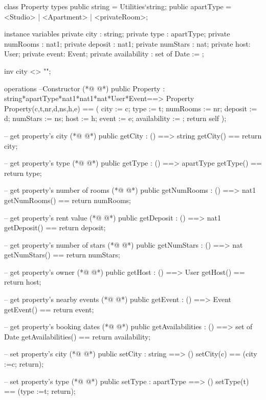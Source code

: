 \begin{vdmpp}[breaklines=true]
class Property
types
 public string = Utilities`string;
 public apartType = <Studio> | <Apartment> | <privateRoom>;

instance variables
 private city : string;
 private type : apartType;
 private numRooms : nat1;
 private deposit : nat1;
 private numStars : nat;
 private host: User;
 private event: Event;
 private availability : set of Date := {};
 
 inv city <> "";
 
operations
 --Constructor
(*@
\label{Property:20}
@*)
 public Property : string*apartType*nat1*nat1*nat*User*Event==> Property
  Property(c,t,nr,d,ns,h,e) ==
  (
   city := c;
   type := t;
   numRooms := nr;
   deposit := d;
   numStars := ns;
   host := h;
   event := e;
   availability := {};
   return self
  );
  
 -- get property's city
(*@
\label{getCity:35}
@*)
 public getCity : () ==> string
  getCity() == return city;
  
 -- get property's type
(*@
\label{getType:39}
@*)
 public getType : () ==> apartType
  getType() == return type;
  
 -- get property's number of rooms
(*@
\label{getNumRooms:43}
@*)
 public getNumRooms : () ==> nat1
  getNumRooms() == return numRooms;
  
 -- get property's rent value
(*@
\label{getDeposit:47}
@*)
 public getDeposit : () ==> nat1
  getDeposit() == return deposit;
  
 -- get property's number of stars
(*@
\label{getNumStars:51}
@*)
 public getNumStars : () ==> nat
  getNumStars() == return numStars;
  
 -- get property's owner
(*@
\label{getHost:55}
@*)
 public getHost : () ==> User
  getHost() == return host;
  
 -- get property's nearby events
(*@
\label{getEvent:59}
@*)
 public getEvent : () ==> Event
  getEvent() == return event;

 -- get property's booking dates
(*@
\label{getAvailabilities:63}
@*)
 public getAvailabilities : () ==> set of Date
  getAvailabilities() == return availability;
 
 -- set property's city
(*@
\label{setCity:67}
@*)
 public setCity : string ==> ()
  setCity(c) == (city :=c; return);
  
 -- set property's type
(*@
\label{setType:71}
@*)
 public setType : apartType ==> ()
  setType(t) == (type :=t; return);
 

\end{vdmpp}
